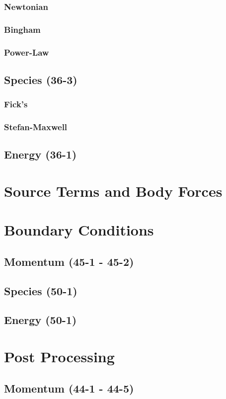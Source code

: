 \documentclass{mitqualif}
\begin{document}
\subsubsection{Newtonian}
\subsubsection{Bingham}
\subsubsection{Power-Law}
\subsection{Species (36-3)}

\subsubsection{Fick's}
\subsubsection{Stefan-Maxwell}
\subsection{Energy (36-1)}
 
\section{Source Terms and Body Forces}
\section{Boundary Conditions}
\subsection{Momentum (45-1 - 45-2)}


\subsection{Species (50-1)}

\subsection{Energy (50-1)}


\section{Post Processing}
\subsection{Momentum (44-1 - 44-5)}





\end{document}
